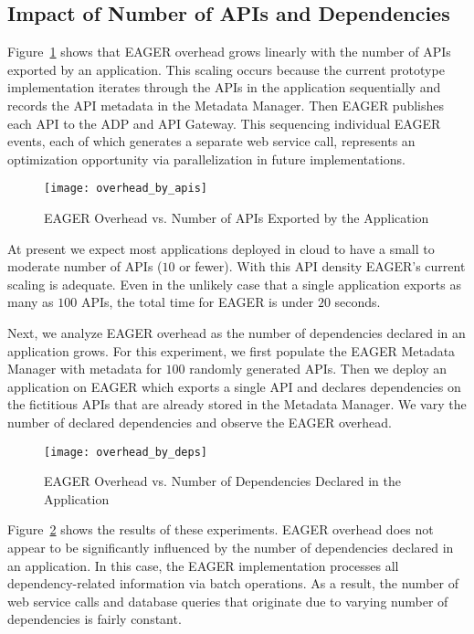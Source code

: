 \subsection{Impact of Number of APIs and Dependencies}

Figure~\ref{fig:overhead_by_apis} shows that EAGER overhead grows linearly
with the number of APIs exported by an application.  This scaling occurs
because the current prototype implementation iterates through the APIs in the
application sequentially and records the API metadata in the Metadata Manager.
Then EAGER publishes each API to the ADP and API Gateway. This sequencing
individual EAGER events, each of which generates a separate web service call,
represents an optimization opportunity via parallelization in future implementations.

\begin{figure}
\centering
\texttt{[image: overhead\_by\_apis]}
\caption{EAGER Overhead vs. Number of APIs Exported by the Application}
\label{fig:overhead_by_apis}
\end{figure}

At present we expect most applications deployed in cloud to have a small to 
moderate number of APIs ($10$ or fewer).  With this API density EAGER's current 
scaling is adequate.  Even in the
unlikely case that a single application exports as many as $100$ APIs,
the total time for EAGER is under $20$ seconds.

Next, we analyze EAGER overhead as the number of dependencies declared in
an application grows. For this experiment, we first populate the EAGER
Metadata Manager with metadata for $100$ randomly generated APIs. Then we
deploy an application on EAGER which exports a single API and declares
dependencies on the fictitious 
APIs that are already stored in the Metadata Manager. We
vary the number of declared dependencies and observe the EAGER overhead.

\begin{figure}
\centering
\texttt{[image: overhead\_by\_deps]}
\caption{EAGER Overhead vs. Number of Dependencies Declared in the Application}
\label{fig:overhead_by_deps}
\end{figure}

Figure~\ref{fig:overhead_by_deps} shows the results of these experiments. 
EAGER overhead does not appear to be significantly
influenced by the number of dependencies declared in an application. 
In this case, the EAGER implementation processes
all dependency-related information via batch operations. 
As a result, the number of web service calls and database queries that originate 
due to varying number of dependencies is fairly constant. 

